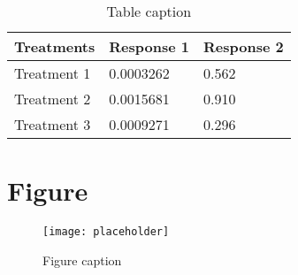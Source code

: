 \documentclass[11pt,fleqn]{book} %
\begin{document}
\begin{table}[h]
\centering
\begin{tabular}{l l l}
\toprule
\textbf{Treatments} & \textbf{Response 1} & \textbf{Response 2}\\
\midrule
Treatment 1 & 0.0003262 & 0.562 \\
Treatment 2 & 0.0015681 & 0.910 \\
Treatment 3 & 0.0009271 & 0.296 \\
\bottomrule
\end{tabular}
\caption{Table caption}
\end{table}


\section{Figure}

\begin{figure}[h]
\centering\texttt{[image: placeholder]}
\caption{Figure caption}
\end{figure}




\cleardoublepage
{}
\setlength{\columnsep}{0.75cm}
\printindex

\end{document}
